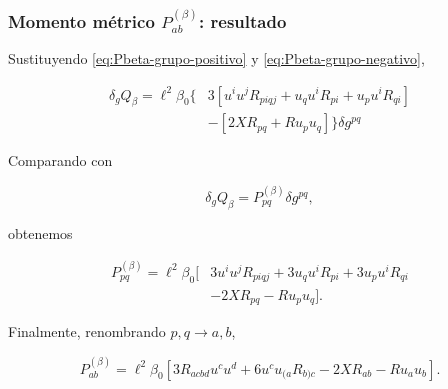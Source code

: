 \documentclass{beamer}
\newcommand{\Eq}[1]{\eqref{#1}}
\newcommand{\CompactDisplaySpacing}{%
  \setlength{\abovedisplayskip}{2pt plus 1pt minus 1pt}%
  \setlength{\belowdisplayskip}{2pt plus 1pt minus 1pt}%
  \setlength{\abovedisplayshortskip}{0pt plus 1pt}%
  \setlength{\belowdisplayshortskip}{1pt plus 1pt}%
}
\begin{document}
\begin{frame}[label=nav-frame-104]
\frametitle{Momento métrico \(P^{(\beta)}_{ab}\): resultado}
\small
\linespread{.96}\selectfont\CompactDisplaySpacing

Sustituyendo \Eq{eq:Pbeta-grupo-positivo} y
\Eq{eq:Pbeta-grupo-negativo},

\[
\begin{aligned}
\delta_g Q_\beta
=
\ell^2\beta_0
\Big\{
&3\left[
u^iu^jR_{piqj}
+
u_q u^iR_{pi}
+
u_p u^iR_{qi}
\right]
\\
&-
\left[
2XR_{pq}
+
Ru_pu_q
\right]
\Big\}
\delta g^{pq}
\end{aligned}
\]

Comparando con

\[
\delta_g Q_\beta
=
P^{(\beta)}_{pq}\delta g^{pq},
\]

obtenemos

\begin{equation}
\boxed{
\begin{aligned}
P^{(\beta)}_{pq}
=
\ell^2\beta_0
\Big[
&3u^iu^jR_{piqj}
+3u_q u^iR_{pi}
+3u_p u^iR_{qi}
\\
&-2XR_{pq}
-Ru_pu_q
\Big].
\end{aligned}
}
\label{eq:Pbeta-metrico-expandido}
\end{equation}

Finalmente, renombrando \(p,q\rightarrow a,b\),

\begin{equation}
\boxed{
P^{(\beta)}_{ab}
=
\ell^2\beta_0
\left[
3R_{acbd}u^cu^d
+
6u^c u_{(a}R_{b)c}
-
2XR_{ab}
-
Ru_a u_b
\right].
}
\label{eq:Pbeta-metrico}
\end{equation}

\end{frame}
\end{document}
